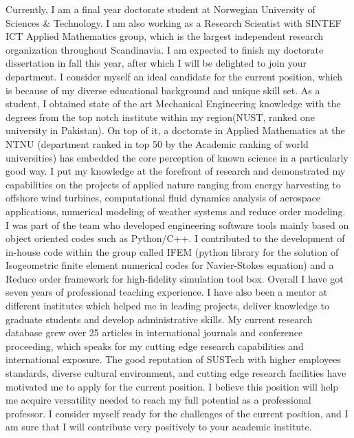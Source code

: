 \documentclass[11pt, a4paper]{awesome-cv}
\begin{document}
\begin{cvletter}
		Currently, I am a final year doctorate student at Norwegian University of Sciences \& Technology. I am also working as a Research Scientist with SINTEF ICT Applied Mathematics group, which is the largest independent research organization throughout Scandinavia.  I am expected to finish my doctorate dissertation in fall this year, after which I will be delighted to join your department.
		I consider myself an ideal candidate for the current position, which is because of my diverse educational background and unique skill set. As a student, I obtained state of the art Mechanical Engineering knowledge with the degrees from the top notch institute within my region(NUST, ranked one university in Pakistan). On top of it, a doctorate in Applied Mathematics at the NTNU (department ranked in top 50 by the Academic ranking of world universities) has embedded the core perception of known science in a particularly good way. I put my knowledge at the forefront of research and demonstrated my capabilities on the projects of applied nature ranging from energy harvesting to offshore wind turbines, computational fluid dynamics analysis of aerospace applications, numerical modeling of weather systems and reduce order modeling. I was part of the team who developed engineering software tools mainly based on object oriented codes such as Python/C++.  I contributed to the development of in-house code within the group called IFEM (python library for the solution of Isogeometric finite element numerical codes for Navier-Stokes equation) and a Reduce order framework for high-fidelity simulation tool box.
		Overall I have got seven years of professional teaching experience. I have also been a mentor at different institutes which helped me in leading projects, deliver knowledge to graduate students and develop administrative skills. My current research database grew over 25  articles in international journals and conference proceeding, which speaks for my cutting edge research capabilities and international exposure.  
		The good reputation of SUSTech with higher employees standards, diverse cultural environment, and cutting edge research facilities have motivated me to apply for the current position. I believe this position will help me acquire versatility needed to reach my full potential as a professional professor. I consider myself ready for the challenges of the current position, and I am sure that I will contribute very positively to your academic institute.
	\end{cvletter}
	
	
	\makeletterclosing
	
\end{document}
